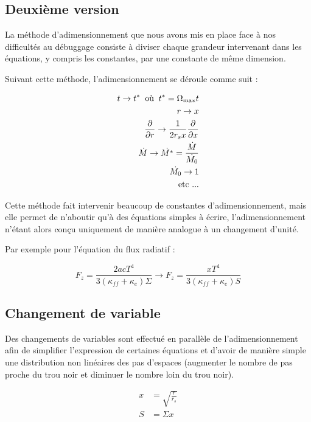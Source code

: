 \documentclass[a4paper,12pt]{article}
\begin{document}
	\subsection{Deuxième version}

La méthode d'adimensionnement que nous avons mis en place face à nos difficultés au débuggage consiste à diviser chaque grandeur intervenant dans les équations, y compris les constantes, par une constante de même dimension.

Suivant cette méthode, l'adimensionnement se déroule comme suit :

	\begin{align}
		t\rightarrow t^*\;\;\textrm{où}\;\;t^*=\Omega_{\rm{max}}t\\
		r\rightarrow x\\
		\frac{\partial}{\partial r}\rightarrow \frac{1}{2r_sx}\frac{\partial}{\partial x}\\
		\dot{M}\rightarrow \dot{M^*}=\frac{\dot{M}}{\dot{M_0}}\\
		\dot{M_0}\rightarrow 1\\
		\textrm{etc ...}
	\end{align}

Cette méthode fait intervenir beaucoup de constantes d'adimensionnement, mais elle permet de n'aboutir qu'à des équations simples à écrire, l'adimensionnement n'étant alors conçu uniquement de manière analogue à un changement d'unité.

Par exemple pour l'équation du flux radiatif :

	\begin{equation}
		F_z=\frac{2acT^4}{3(\kappa_{ff}+\kappa_e)\Sigma}\rightarrow F_z=\frac{xT^4}{3(\kappa_{ff}+\kappa_e)S}
	\end{equation}
	
\subsection{Changement de variable}

	Des changements de variables sont effectué en parallèle de l'adimensionnement afin de simplifier l’expression de certaines équations et d'avoir de manière simple une distribution non linéaires des pas d'espaces (augmenter le nombre de pas proche du trou noir et diminuer le nombre loin du trou noir).
	
	\begin{align}
		x &= \sqrt{\frac{r}{r_s}} \label{eq:xdeff}\\
		S &= \Sigma x \label{eq:Sdeff}
	\end{align}
	
\end{document}
